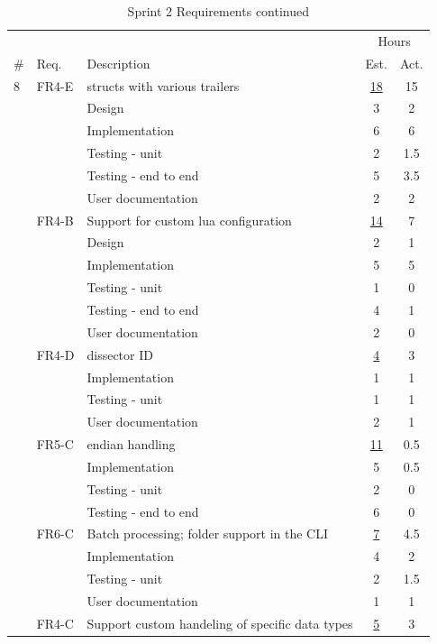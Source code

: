 \begin{table}[!htb] \small \center
\caption{Sprint 2 Requirements continued\label{tab:sprint2req2}}
\begin{tabularx}{\textwidth}{l l X c c}
	\toprule
	& & & \multicolumn{2}{c}{Hours} \\
	\cmidrule(r){4-5}
	\# & Req. & Description & Est. & Act. \\
	\midrule
	8 & FR4-E & \Glspl{struct} with various \gls{trailers} & \underline{ 18 } & 15 \\
	   &  & Design & 3 & 2 \\
	   &  & Implementation & 6 & 6 \\
	   &  & Testing - unit & 2 & 1.5 \\
	   &  & Testing - end to end & 5 & 3.5 \\
	   &  & User documentation & 2 & 2 \\
	\addlinespace
	9 & FR4-B & Support for custom \Gls{lua} configuration & \underline{ 14 } & 7 \\
	   &  & Design & 2 & 1 \\
	   &  & Implementation & 5 & 5 \\
	   &  & Testing - unit & 1 & 0 \\
	   &  & Testing - end to end & 4 & 1 \\
	   &  & User documentation & 2 & 0 \\
	\addlinespace
	10 & FR4-D & \Gls{dissector} ID & \underline{ 4 } & 3 \\
	   &  & Implementation & 1 & 1 \\
	   &  & Testing - unit & 1 & 1 \\
	   &  & User documentation & 2 & 1 \\
	\addlinespace
	11 & FR5-C & \Gls{endian} handling & \underline{ 11 } & 0.5 \\
	   &  & Implementation & 5 & 0.5 \\
	   &  & Testing - unit & 2 & 0 \\
	   &  & Testing - end to end & 6 & 0 \\
	\addlinespace
	12 & FR6-C & Batch processing; folder support in the CLI & \underline{ 7 } & 4.5 \\
	   &  & Implementation & 4 & 2 \\
	   &  & Testing - unit & 2 & 1.5 \\
	   &  & User documentation & 1 & 1 \\
	\addlinespace
	13 & FR4-C & Support custom handeling of specific data types & \underline{ 5 } & 3 \\

\end{tabularx}
\end{table}
